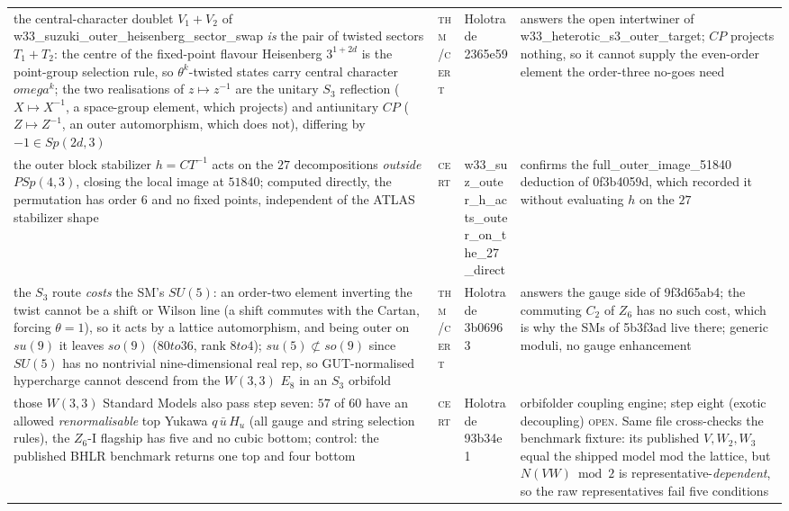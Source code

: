 \documentclass[12pt,a4paper]{article}
\def\mathbb#1{#1}%
\def\mathfrak#1{#1}%
\def\texttt#1{#1}%
\def\omega{omega}%
\def\cdot{ }%
\def\to{ to }%
\theoremstyle{definition}
\newcommand{\ZZ}{\mathbb{Z}}
\begin{document}
\begin{center}
\begin{tabular}{@{}p{}llp{}@{}}
the central-character doublet $V_1{+}V_2$ of \texttt{w33\_suzuki\_outer\_heisenberg\_sector\_swap} \emph{is} the pair of twisted sectors $T_1{+}T_2$: the centre of the fixed-point flavour Heisenberg $3^{1+2d}$ is the point-group selection rule, so $\theta^k$-twisted states carry central character $\omega^k$; the two realisations of $z\mapsto z^{-1}$ are the unitary $S_3$ reflection ($X\mapsto X^{-1}$, a space-group element, which projects) and antiunitary $CP$ ($Z\mapsto Z^{-1}$, an outer automorphism, which does not), differing by $-1\in Sp(2d,3)$ & \textsc{thm}/\textsc{cert} & Holotrade \texttt{2365e59} & answers the open intertwiner of \texttt{w33\_heterotic\_s3\_outer\_target}; $CP$ projects nothing, so it cannot supply the even-order element the order-three no-goes need \\
the outer block stabilizer $h=CT^{-1}$ acts on the $27$ decompositions \emph{outside} $PSp(4,3)$, closing the local image at $51840$; computed directly, the permutation has order $6$ and no fixed points, independent of the ATLAS stabilizer shape & \textsc{cert} & \texttt{w33\_suz\_outer\_h\_acts\_outer\_on\_the\_27\_direct} & confirms the \texttt{full\_outer\_image\_51840} deduction of \texttt{0f3b4059d}, which recorded it without evaluating $h$ on the $27$ \\
the $S_3$ route \emph{costs} the SM's $SU(5)$: an order-two element inverting the twist cannot be a shift or Wilson line (a shift commutes with the Cartan, forcing $\theta=1$), so it acts by a lattice automorphism, and being outer on $\mathfrak{su}(9)$ it leaves $\mathfrak{so}(9)$ ($80\to 36$, rank $8\to 4$); $\mathfrak{su}(5)\not\subset\mathfrak{so}(9)$ since $SU(5)$ has no nontrivial nine-dimensional real rep, so GUT-normalised hypercharge cannot descend from the $W(3,3)$ $E_8$ in an $S_3$ orbifold & \textsc{thm}/\textsc{cert} & Holotrade \texttt{3b06963} & answers the gauge side of \texttt{9f3d65ab4}; the commuting $C_2$ of $\ZZ_6$ has no such cost, which is why the SMs of \texttt{5b3f3ad} live there; generic moduli, no gauge enhancement \\
those $W(3,3)$ Standard Models also pass step seven: $57$ of $60$ have an allowed \emph{renormalisable} top Yukawa $q\,\bar u\,H_u$ (all gauge and string selection rules), the $\ZZ_6$-I flagship has five and no cubic bottom; control: the published BHLR benchmark returns one top and four bottom & \textsc{cert} & Holotrade \texttt{93b34e1} & orbifolder coupling engine; step eight (exotic decoupling) \textsc{open}. Same file cross-checks the benchmark fixture: its published $V,W_2,W_3$ equal the shipped model mod the lattice, but $N(V\!\cdot\!W)\bmod 2$ is representative-\emph{dependent}, so the raw representatives fail five conditions \\

\end{tabular}
\end{center}
\end{document}
